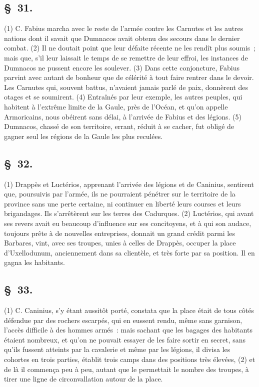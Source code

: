 \documentclass[french,twoside]{book} %
\begin{document}
\subsection[{§ 31.}]{ \textsc{§ 31.} }
\noindent (1) C. Fabius marcha avec le reste de l’armée contre les Carnutes et les autres nations dont il savait que Dumnacos avait obtenu des secours dans le dernier combat. (2) Il ne doutait point que leur défaite récente ne les rendît plus soumis ; mais que, s’il leur laissait le temps de se remettre de leur effroi, les instances de Dumnacos ne pussent encore les soulever. (3) Dans cette conjoncture, Fabius parvint avec autant de bonheur que de célérité à tout faire rentrer dans le devoir. Les Carnutes qui, souvent battus, n’avaient jamais parlé de paix, donnèrent des otages et se soumirent. (4) Entraînés par leur exemple, les autres peuples, qui habitent à l’extrême limite de la Gaule, près de l’Océan, et qu’on appelle Armoricains, nous obéirent sans délai, à l’arrivée de Fabius et des légions. (5) Dumnacos, chassé de son territoire, errant, réduit à se cacher, fut obligé de gagner seul les régions de la Gaule les plus reculées.
\subsection[{§ 32.}]{ \textsc{§ 32.} }
\noindent (1) Drappès et Luctérios, apprenant l’arrivée des légions et de Caninius, sentirent que, poursuivis par l’armée, ils ne pourraient pénétrer sur le territoire de la province sans une perte certaine, ni continuer en liberté leurs courses et leurs brigandages. Ils s’arrêtèrent sur les terres des Cadurques. (2) Luctérios, qui avant ses revers avait eu beaucoup d’influence sur ses concitoyens, et à qui son audace, toujours prête à de nouvelles entreprises, donnait un grand crédit parmi les Barbares, vint, avec ses troupes, unies à celles de Drappès, occuper la place d’Uxellodunum, anciennement dans sa clientèle, et très forte par sa position. Il en gagna les habitants.
\subsection[{§ 33.}]{ \textsc{§ 33.} }
\noindent (1) C. Caninius, s’y étant aussitôt porté, constata que la place était de tous côtés défendue par des rochers escarpés, qui en eussent rendu, même sans garnison, l’accès difficile à des hommes armés : mais sachant que les bagages des habitants étaient nombreux, et qu’on ne pouvait essayer de les faire sortir en secret, sans qu’ils fussent atteints par la cavalerie et même par les légions, il divisa les cohortes en trois parties, établit trois camps dans des positions très élevées, (2) et de là il commença peu à peu, autant que le permettait le nombre des troupes, à tirer une ligne de circonvallation autour de la place.
\end{document}
